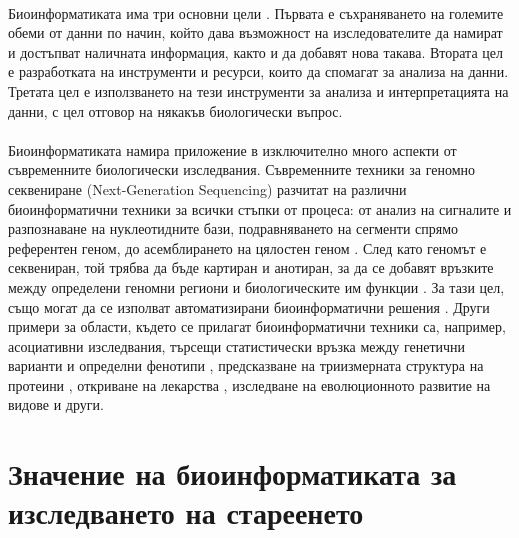 \documentclass[pdftex,cyrillic,14pt,a4page,twoside,openright]{extreport}
\begin{document}
\paragraph{}
Биоинформатиката има три основни цели \cite{luscombe2001}. Първата е съхраняването на големите обеми от данни по начин, който дава възможност на изследователите да намират и достъпват наличната информация, както и да добавят нова такава. Втората цел е разработката на инструменти и ресурси, които да спомагат за анализа на данни. Третата цел е използването на тези инструменти за анализа и интерпретацията на данни, с цел отговор на някакъв биологически въпрос.

\paragraph{}
Биоинформатиката намира приложение в изключително много аспекти от съвременните биологически изследвания. Съвременните техники за геномно секвениране (Next-Generation Sequencing) разчитат на различни биоинформатични техники за всички стъпки от процеса: от анализ на сигналите и разпознаване на нуклеотидните бази, подравняването на сегменти спрямо референтен геном, до асемблирането на цялостен геном \cite{oliver2015}. След като геномът е секвениран, той трябва да бъде картиран и анотиран, за да се добавят връзките между определени геномни региони и биологическите им функции \cite{aken2016}. За тази цел, също могат да се изполват автоматизирани биоинформатични решения \cite{curwen2004}. Други примери за области, където се прилагат биоинформатични техники са, например, асоциативни изследвания, търсещи статистически връзка между генетични варианти и определни фенотипи \cite{moore2010}, предсказване на триизмерната структура на протеини \cite{alphafold2021}, откриване на лекарства \cite{searls2000}, изследване на еволюционното развитие на видове \cite{diniz2017} и други.

\section[Значение на биоинформатиката за изследването на стареенето]{Значение на биоинформатиката за\\ изследването на стареенето}
\end{document}
